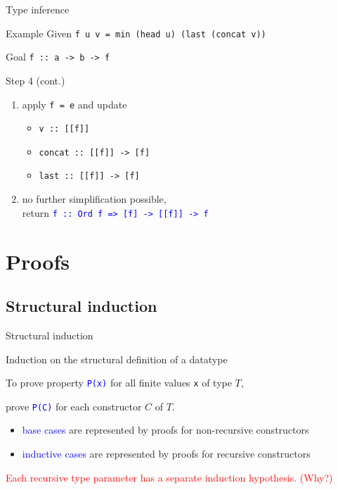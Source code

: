 \documentclass{beamer}
\def\code#1{\texttt{\frenchspacing#1}}
\begin{document}
\begin{frame}{Type inference}

\begin{exampleblock}{Example}
Given \code{f u v = min (head u) (last (concat v))} \par
Goal \code{f :: a -> b -> f}

\vspace{0.25cm}
Step 4 (cont.)\pause
\begin{enumerate}
    \item apply \code{f = e} and update\pause
        \begin{itemize}
            \item \code{v :: [[f]]}\pause
            \item \code{concat :: [[f]] -> [f]}\pause
            \item \code{last :: [[f]] -> [f]}\pause
        \end{itemize}
    \item no further simplification possible, \\ return \textcolor{blue}{\code{f :: Ord f => [f] -> [[f]] -> f}}
\end{enumerate}
\end{exampleblock}

\end{frame}

\section{Proofs}

\subsection{Structural induction}

\begin{frame}{Structural induction}

\begin{block}{\centering Induction on the structural definition of a datatype}
\end{block}

\pause

To prove property \textcolor{blue}{\code{P(x)}} for all finite values \code{x} of type $T$, \par
prove \textcolor{blue}{\code{P(C)}} for each constructor $C$ of $T$.

\pause

\vspace{0.5cm}
\begin{itemize}
    \item \textcolor{blue}{base cases} are represented by proofs for non-recursive constructors\pause
    \item \textcolor{blue}{inductive cases} are represented by proofs for recursive constructors
\end{itemize}

\pause

\vspace{0.5cm}
\textcolor{red}{Each recursive type parameter has a separate induction hypothesis. (Why?)}

\end{frame}
\end{document}
